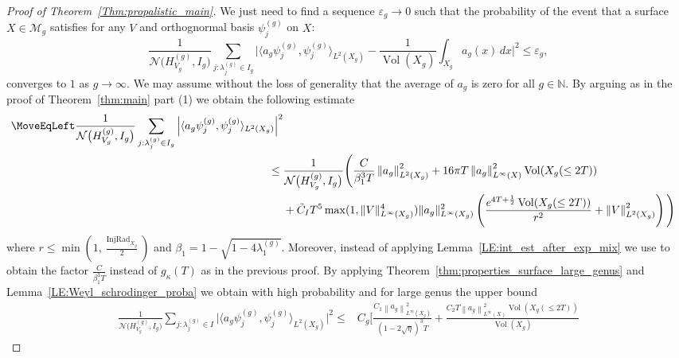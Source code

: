\documentclass[11pt,twoside,reqno]{amsart}
\newcommand{\N}{\mathbb{N}}
\newcommand{\cM}{\mathcal{M}}
\newcommand{\eps}{\varepsilon}
\newcommand{\1}{\mathrm{\mathbf{1}}}
\DeclareMathOperator{\Vol}{Vol}
\DeclareMathOperator{\vol}{Vol}
\DeclareMathOperator{\InjRad}{InjRad}
\newcommand{\norm}[1]{\left\lVert#1\right\rVert}
\numberwithin{equation}{section}
\theoremstyle{plain}
\theoremstyle{definition}
\theoremstyle{remark}
\begin{document}
\begin{proof}[Proof of Theorem~\ref{Thm:propalistic_main}]
We just need to find a sequence $\eps_g \to 0$ such that the probability of the event that a surface $X \in \cM_g$ satisfies for any $V$ and orthognormal basis $\psi_j^{(g)}$ on $X$:
\begin{equation*}
\frac{1}{\mathcal{N}\big(H_{V_g}^{(g)},I_g\big)} \sum_{j:\lambda_j^{(g)}\in I_g} \Big| \langle a_g \psi_j^{(g)} , \psi_j^{(g)}\rangle_{L^2(X_g)} - \frac{1}{\Vol(X_g)} \int_{X_g} a_g(x)  \, dx \Big|^2 \leq \eps_g,
\end{equation*}
converges to $1$ as $g \to \infty$. We may assume without the loss of generality that the average of $a_g$ is zero for all $g\in\N$. By arguing as in the proof of Theorem~\ref{thm:main} part (1) we obtain the following estimate
\begin{equation*}
    \begin{aligned}
        \MoveEqLeft \frac{1}{\mathcal{N}\big(H_{V_g}^{(g)},I_g\big)} \sum_{j:\lambda_j^{(g)}\in I_g} \Big| \langle a_g \psi_j^{(g)} , \psi_j^{(g)}\rangle_{L^2(X_g)}\Big|^2 
        \\
        \leq{}& \frac{1}{\mathcal{N}\big(H_{V_g}^{(g)},I_g\big)} \Bigg(  \frac{C}{\beta_1^3 T} \norm{a_g}^2_{L^2(X_g)}+  16\pi T \norm{a_g}_{L^\infty(X)}^2 \vol(X_g(\leq 2T))
       \\
       &+ \tilde{C}_I T^5  \max(1, \lVert V\rVert_{L^\infty(X_g)}^4)  \lVert a_g \rVert^2_{L^\infty(X_g)}\left( \frac{  e^{4T+\frac12} \Vol(X_g(\leq2T))}{r^2} + \norm{V}_{L^2(X_g)}^2 \right)\Bigg)
    \end{aligned}
\end{equation*}
where $r\leq \min(1,\frac{\InjRad_{X_g}}{2})$ and $\beta_1 = 1-\sqrt{1-4\lambda_1^{(g)}}$. Moreover, instead of applying Lemma~\ref{LE:int_est_after_exp_mix} we use \cite[Lemma~{6.6}]{Hippi} to obtain the factor $\frac{C}{\beta_1^3 T}$ instead of $g_\kappa(T)$ as in the previous proof. By applying Theorem~\ref{thm:properties_surface_large_genus} and Lemma~\ref{LE:Weyl_schrodinger_proba} we obtain with high probability and for large genus the upper bound 
\begin{equation*}
    \begin{aligned}
         \frac{1}{\mathcal{N}\big(H_{V_g}^{(g)},I_g\big)} \sum_{j:\lambda_j^{(g)}\in I} \Big| \langle a_g \psi_j^{(g)} , \psi_j^{(g)}\rangle_{L^2(X_g)}\Big|^2 
        \leq{}& C_g \Bigg[  \frac{C_1\norm{a_g}^2_{L^\infty(X_g)}}{(1-2\sqrt{\eta})^3 T } +  \frac{C_2 T\norm{a_g}_{L^\infty(X)}^2 \vol(X_g(\leq 2T))}{\Vol(X_g)}

\end{aligned}
\end{equation*}
\end{proof}
\end{document}
